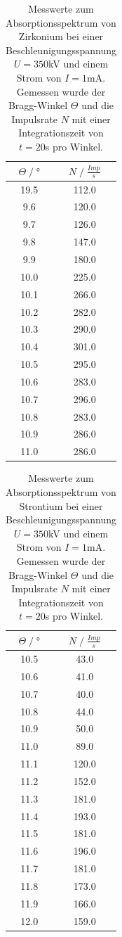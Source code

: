 \begin{table}[H]
    \centering
    \begin{tabular}{c c}
        \toprule
        $\Theta\;/\;°$& $N\;/\;\frac{Imp}{s}$\\
        \midrule
        19.5	&112.0\\
        9.6	    &120.0\\
        9.7	    &126.0\\
        9.8	    &147.0\\
        9.9	    &180.0\\
        10.0	&225.0\\
        10.1	&266.0\\
        10.2	&282.0\\
        10.3	&290.0\\
        10.4	&301.0\\
        10.5	&295.0\\
        10.6	&283.0\\
        10.7	&296.0\\
        10.8	&283.0\\
        10.9	&286.0\\
        11.0	&286.0\\
        \bottomrule
    \end{tabular}
    \caption{Messwerte zum Absorptionsspektrum von Zirkonium bei einer Beschleunigungsspannung 
    $U=350$kV und einem Strom von $I=1$mA.\\
    Gemessen wurde der Bragg-Winkel $\Theta$ und die Impulsrate $N$ mit einer Integrationszeit
    von $t=20$s pro Winkel.}
\end{table}
\begin{table}[H]
    \centering
    \begin{tabular}{c c}
        \toprule
        $\Theta\;/\;°$& $N\;/\;\frac{Imp}{s}$\\
        \midrule
        10.5&	43.0\\
        10.6&	41.0\\
        10.7&	40.0\\
        10.8&	44.0\\
        10.9&	50.0\\
        11.0&	89.0\\
        11.1&	120.0\\
        11.2&	152.0\\
        11.3&	181.0\\
        11.4&	193.0\\
        11.5&	181.0\\
        11.6&	196.0\\
        11.7&	181.0\\
        11.8&	173.0\\
        11.9&	166.0\\
        12.0&	159.0\\
        \bottomrule
    \end{tabular}
    \caption{Messwerte zum Absorptionsspektrum von Strontium bei einer Beschleunigungsspannung 
    $U=350$kV und einem Strom von $I=1$mA.\\
    Gemessen wurde der Bragg-Winkel $\Theta$ und die Impulsrate $N$ mit einer Integrationszeit
    von $t=20$s pro Winkel.}
\end{table}
